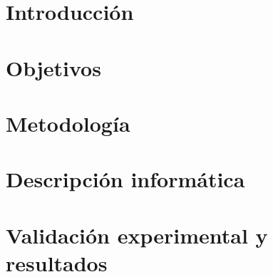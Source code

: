 \documentclass[12pt,twoside,titlepage]{report}
\newcommand\blankpage{%
    \newpage
    \null
    \thispagestyle{empty}%
    \newpage}
\begin{document}
\chapter{Introducción}



\pagestyle{fancy}


\setlength{\parskip}{0.75em}
\renewcommand{\baselinestretch}{1.25}
\setcounter{page}{1}






\chapter{Objetivos}



\blankpage

\chapter{Metodología}



\blankpage

\chapter{Descripción informática}



\blankpage


% 


\chapter{Validación experimental y resultados}
\label{sec:resulObtenidos}
\end{document}
